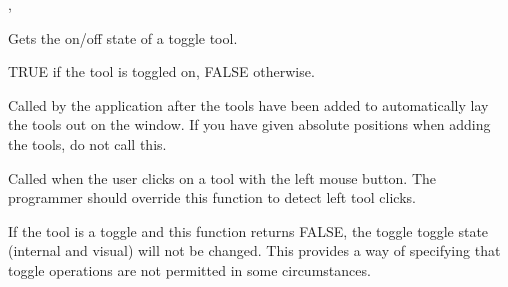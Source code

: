 


,\rtfsp
{}\rtfsp

\label{wxtoolbarbasegettoolstate}


Gets the on/off state of a toggle tool.




TRUE if the tool is toggled on, FALSE otherwise.

%
%
\label{wxtoolbarbaselayout}


Called by the application after the tools have been added to
automatically lay the tools out on the window. If you have given
absolute positions when adding the tools, do not call this.

\label{wxtoolbarbaseonleftclick}


Called when the user clicks on a tool with the left mouse button. The
programmer should override this function to detect left tool clicks.





If the tool is a toggle and this function returns FALSE, the toggle
toggle state (internal and visual) will not be changed. This provides a way of
specifying that toggle operations are not permitted in some circumstances.


